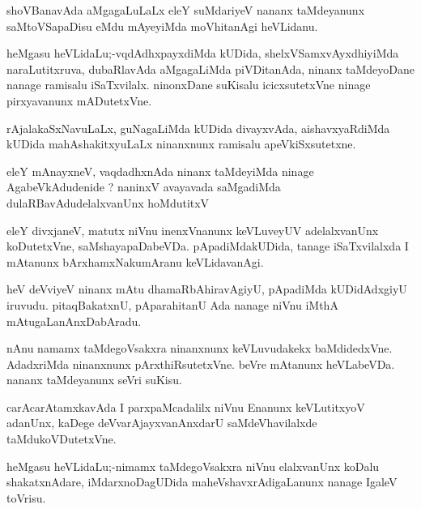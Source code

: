 \documentclass{article}
\begin{document}
\begin{mn}
shoVBanavAda aMgagaLuLaLx eleY suMdariyeV nananx taMdeyanunx 
saMtoVSapaDisu eMdu mAyeyiMda moVhitanAgi heVLidanu.
\end{mn} 

\begin{mn}
heMgasu heVLidaLu;-vqdAdhxpayxdiMda kUDida, shelxVSamxvAyxdhiyiMda
naraLutitxruva, dubaRlavAda aMgagaLiMda piVDitanAda, ninanx 
taMdeyoDane nanage ramisalu iSaTxvilalx. ninonxDane suKisalu 
icicxsutetxVne  ninage pirxyavanunx mADutetxVne.
\end{mn} 

\begin{mn}
rAjalakaSxNavuLaLx, guNagaLiMda kUDida divayxvAda, aishavxyaRdiMda
kUDida mahAshakitxyuLaLx ninanxnunx ramisalu 
apeVkiSxsutetxne.
\end{mn} 

\begin{mn}
eleY mAnayxneV, vaqdadhxnAda ninanx taMdeyiMda ninage 
 AgabeVkAdudenide ? naninxV avayavada saMgadiMda 
 dulaRBavAdudelalxvanUnx hoMdutitxV
\end{mn} 

\begin{mn}
eleY divxjaneV, matutx niVnu inenxVnanunx keVLuveyUV adelalxvanUnx 
koDutetxVne, saMshayapaDabeVDa. pApadiMdakUDida, tanage iSaTxvilalxda 
I mAtanunx bArxhamxNakumAranu keVLidavanAgi.
\end{mn} 

\begin{mn}
heV deVviyeV ninanx mAtu dhamaRbAhiravAgiyU, pApadiMda kUDidAdxgiyU
iruvudu.  pitaqBakatxnU, pAparahitanU Ada nanage niVnu iMthA 
mAtugaLanAnxDabAradu.
\end{mn} 

\begin{mn}
nAnu namamx taMdegoVsakxra ninanxnunx keVLuvudakekx baMdidedxVne. 
AdadxriMda ninanxnunx pArxthiRsutetxVne. beVre mAtanunx
heVLabeVDa. nananx taMdeyanunx seVri suKisu.
\end{mn} 

\begin{mn}
carAcarAtamxkavAda I parxpaMcadalilx niVnu Enanunx keVLutitxyoV 
adanUnx, kaDege deVvarAjayxvanAnxdarU
 saMdeVhavilalxde taMdukoVDutetxVne.
\end{mn} 

\begin{mn}
heMgasu heVLidaLu;-nimamx taMdegoVsakxra niVnu elalxvanUnx
koDalu shakatxnAdare, iMdarxnoDagUDida maheVshavxrAdigaLanunx 
nanage IgaleV toVrisu.
\end{mn} 
\end{document}
